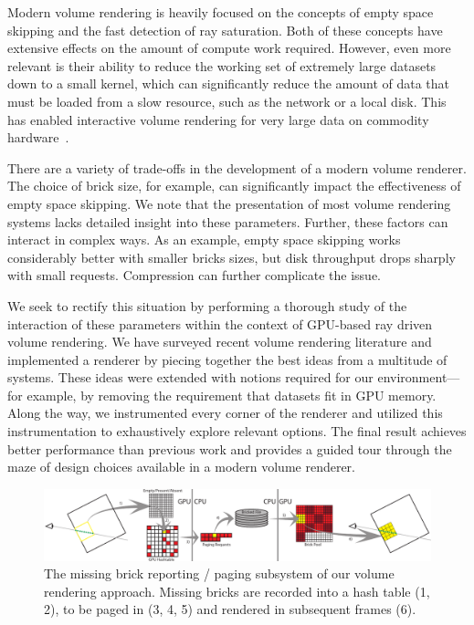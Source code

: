 Modern volume rendering is heavily focused on the concepts of empty
space skipping and the fast detection of ray saturation.  Both of
these concepts have extensive effects on the amount of compute work
required.  However, even more relevant is their ability to reduce the
working set of extremely large datasets down to a small kernel, which
can significantly reduce the amount of data that must be loaded from a
slow resource, such as the network or a local disk.  This has enabled
interactive volume rendering for very large data on commodity
hardware~\cite{Knoll:2010:BVH, Hadwiger:2012:Guided,
Crassin:2009:Gigavoxels}.

There are a variety of trade-offs in the development of a modern volume
renderer.  The choice of brick size, for example, can significantly
impact the effectiveness of empty space skipping.  We note that the
presentation of most volume rendering systems lacks detailed insight
into these parameters.  Further, these factors can interact in complex
ways.  As an example, empty space skipping works considerably better
with smaller bricks sizes, but disk throughput drops sharply with small
requests.  Compression can further complicate the issue.

We seek to rectify this situation by performing a thorough study of
the interaction of these parameters within the context of GPU-based
ray driven volume rendering.  We have surveyed recent volume rendering
literature and implemented a renderer by piecing together the best
ideas from a multitude of systems. These ideas were extended with
notions required for our environment---for example, by removing
the requirement that datasets fit in GPU memory.  Along the way,
we instrumented every corner of the renderer and utilized this
instrumentation to exhaustively explore relevant options.  The final
result achieves better performance than previous work and provides a
guided tour through the maze of design choices available in a modern
volume renderer.

\begin{figure}
  \centering
  \includegraphics[width=1.00\linewidth]{images/rg/pipeline.pdf}
  \caption{The missing brick reporting / paging subsystem of our volume
  rendering approach.  Missing bricks are recorded into a hash table
  (1, 2), to be paged in (3, 4, 5) and rendered in subsequent frames
  (6).}
  \label{fig:flow}
\end{figure}

